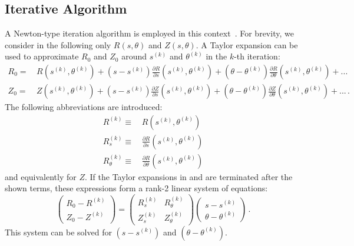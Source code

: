 \subsection{Iterative Algorithm}
%
A Newton-type iteration algorithm is employed in this context~\cite{attenberger_1987}.
%
For brevity, we consider in the following only $R(s,\theta)$ and $Z(s,\theta)$.
%
A Taylor expansion can be used to approximate $R_0$ and $Z_0$ around $s^{(k)}$ and $\theta^{(k)}$
in the $k$-th iteration:
\begin{align}
 R_0 =&\, R(s^{(k)},\theta^{(k)}) +
          (     s -      s^{(k)}) \frac{\partial R}{\partial      s}(s^{(k)}, \theta^{(k)}) +
          (\theta - \theta^{(k)}) \frac{\partial R}{\partial \theta}(s^{(k)}, \theta^{(k)}) + ... \label{eqn:approx_r} \\
 Z_0 =&\, Z(s^{(k)},\theta^{(k)}) +
          (     s -      s^{(k)}) \frac{\partial Z}{\partial      s}(s^{(k)}, \theta^{(k)}) +
          (\theta - \theta^{(k)}) \frac{\partial Z}{\partial \theta}(s^{(k)}, \theta^{(k)}) + ... \label{eqn:approx_z} \, .
\end{align}
The following abbreviations are introduced:
\begin{align}
 R^{(k)}        \equiv&\, R(s^{(k)},\theta^{(k)}) \\
 R^{(k)}_s      \equiv&\, \frac{\partial R}{\partial      s}(s^{(k)}, \theta^{(k)}) \\
 R^{(k)}_\theta \equiv&\, \frac{\partial R}{\partial \theta}(s^{(k)}, \theta^{(k)})
\end{align}
and equivalently for $Z$.
%
If the Taylor expansions in  and  are terminated after the shown terms,
these expressions form a rank-2 linear system of equations:
\begin{equation}
  \begin{pmatrix}
    R_0 - R^{(k)} \\
    Z_0 - Z^{(k)}
  \end{pmatrix}
  =
  \begin{pmatrix}
    R^{(k)}_s & R^{(k)}_\theta \\
    Z^{(k)}_s & Z^{(k)}_\theta
  \end{pmatrix}
  \begin{pmatrix}
    s - s^{(k)} \\
    \theta - \theta^{(k)}
  \end{pmatrix} \label{eqn:approx_rz} \, .
\end{equation}
This system can be solved for $(s - s^{(k)})$ and $(\theta - \theta^{(k)})$.
